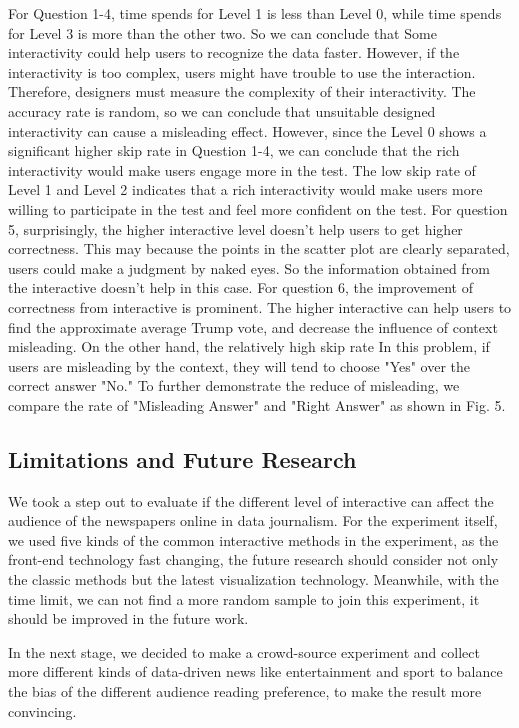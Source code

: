 \documentclass[9pt,journal,compsoc]{IEEEtran}
\begin{document}
For Question 1-4, time spends for Level 1 is less than Level 0, while time spends for Level 3 is more than the other two. So we can conclude that Some interactivity could help users to recognize the data faster. However, if the interactivity is too complex, users might have trouble to use the interaction. Therefore, designers must measure the complexity of their interactivity. The accuracy rate is random, so we can conclude that unsuitable designed interactivity can cause a misleading effect. However, since the Level 0 shows a significant higher skip rate in Question 1-4, we can conclude that the rich interactivity would make users engage more in the test. The low skip rate of Level 1 and Level 2 indicates that a rich interactivity would make users more willing to participate in the test and feel more confident on the test.
For question 5, surprisingly, the higher interactive level doesn't help users to get higher correctness. This may because the points in the scatter plot are clearly separated,  users could make a judgment by naked eyes. So the information obtained from the interactive doesn't help in this case. For question 6, the improvement of correctness from interactive is prominent. The higher interactive can help users to find the approximate average Trump vote, and decrease the influence of context misleading. On the other hand, the relatively high skip rate 
In this problem, if users are misleading by the context, they will tend to choose "Yes" over the correct answer "No." To further demonstrate the reduce of misleading, we compare the rate of "Misleading Answer" and "Right Answer" as shown in Fig. 5.

\subsection{Limitations and Future Research}

We took a step out to evaluate if the different level of interactive can affect the audience of the newspapers online in data journalism. For the experiment itself, we used five kinds of the common interactive methods in the experiment, as the front-end technology fast changing, the future research should consider not only the classic methods but the latest visualization technology. Meanwhile, with the time limit, we can not find a more random sample to join this experiment, it should be improved in the future work.

In the next stage, we decided to make a crowd-source experiment and collect more different kinds of data-driven news like entertainment and sport to balance the bias of the different audience reading preference, to make the result more convincing.
\end{document}
